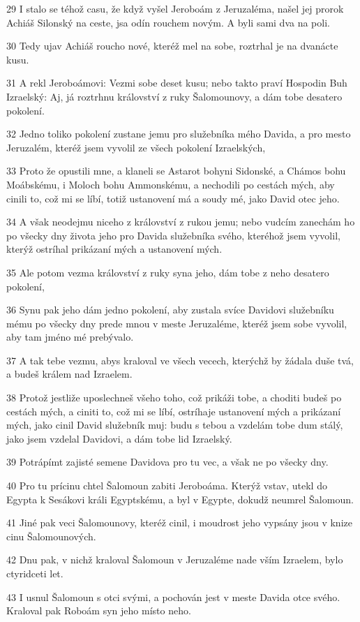\par 29 I stalo se téhož casu, že když vyšel Jeroboám z Jeruzaléma, našel jej prorok Achiáš Silonský na ceste, jsa odín rouchem novým. A byli sami dva na poli.
\par 30 Tedy ujav Achiáš roucho nové, kteréž mel na sobe, roztrhal je na dvanácte kusu.
\par 31 A rekl Jeroboámovi: Vezmi sobe deset kusu; nebo takto praví Hospodin Buh Izraelský: Aj, já roztrhnu království z ruky Šalomounovy, a dám tobe desatero pokolení.
\par 32 Jedno toliko pokolení zustane jemu pro služebníka mého Davida, a pro mesto Jeruzalém, kteréž jsem vyvolil ze všech pokolení Izraelských,
\par 33 Proto že opustili mne, a klaneli se Astarot bohyni Sidonské, a Chámos bohu Moábskému, i Moloch bohu Ammonskému, a nechodili po cestách mých, aby cinili to, což mi se líbí, totiž ustanovení má a soudy mé, jako David otec jeho.
\par 34 A však neodejmu niceho z království z rukou jemu; nebo vudcím zanechám ho po všecky dny života jeho pro Davida služebníka svého, kteréhož jsem vyvolil, kterýž ostríhal prikázaní mých a ustanovení mých.
\par 35 Ale potom vezma království z ruky syna jeho, dám tobe z neho desatero pokolení,
\par 36 Synu pak jeho dám jedno pokolení, aby zustala svíce Davidovi služebníku mému po všecky dny prede mnou v meste Jeruzaléme, kteréž jsem sobe vyvolil, aby tam jméno mé prebývalo.
\par 37 A tak tebe vezmu, abys kraloval ve všech vecech, kterýchž by žádala duše tvá, a budeš králem nad Izraelem.
\par 38 Protož jestliže uposlechneš všeho toho, což prikáži tobe, a choditi budeš po cestách mých, a ciniti to, což mi se líbí, ostríhaje ustanovení mých a prikázaní mých, jako cinil David služebník muj: budu s tebou a vzdelám tobe dum stálý, jako jsem vzdelal Davidovi, a dám tobe lid Izraelský.
\par 39 Potrápímt zajisté semene Davidova pro tu vec, a však ne po všecky dny.
\par 40 Pro tu prícinu chtel Šalomoun zabiti Jeroboáma. Kterýž vstav, utekl do Egypta k Sesákovi králi Egyptskému, a byl v Egypte, dokudž neumrel Šalomoun.
\par 41 Jiné pak veci Šalomounovy, kteréž cinil, i moudrost jeho vypsány jsou v knize cinu Šalomounových.
\par 42 Dnu pak, v nichž kraloval Šalomoun v Jeruzaléme nade vším Izraelem, bylo ctyridceti let.
\par 43 I usnul Šalomoun s otci svými, a pochován jest v meste Davida otce svého. Kraloval pak Roboám syn jeho místo neho.

